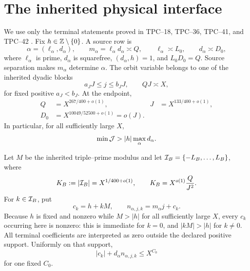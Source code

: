 \section{The inherited physical interface}
\label{sec:tpc43-interface}

We use only the terminal statements proved in TPC--18, TPC--36,
TPC--41, and TPC--42
\citep{WangTPC18,WangTPC36,WangTPC41,WangTPC42}.  Fix
\(h\in\mathbb Z\setminus\{0\}\).  A source row is
\begin{equation}
 \alpha=(\ell_\alpha,d_\alpha),
 \qquad
 m_\alpha=\ell_\alpha d_\alpha\asymp Q,
 \qquad
 \ell_\alpha\asymp L_0,
 \qquad
 d_\alpha\asymp D_0,
 \label{eq:tpc43-row}
\end{equation}
where \(\ell_\alpha\) is prime, \(d_\alpha\) is squarefree,
\((d_\alpha,h)=1\), and \(L_0D_0=Q\).  Source separation makes
\(m_\alpha\) determine \(\alpha\).  The orbit variable belongs to one
of the inherited dyadic blocks
\begin{equation}
 a_JJ\le j\le b_JJ,
 \qquad QJ\asymp X,
 \label{eq:tpc43-orbit-block}
\end{equation}
for fixed positive \(a_J<b_J\).  At the endpoint,
\begin{align}
 Q&=X^{267/400+o(1)},
 &J&=X^{133/400+o(1)},
 \label{eq:tpc43-QJ-endpoint}\\
 D_0&=X^{10049/52500+o(1)}=o(J).
 \label{eq:tpc43-D-endpoint}
\end{align}
In particular, for all sufficiently large \(X\),
\begin{equation}
 \min\mathcal J>|h|\max_\alpha d_\alpha.
 \label{eq:tpc43-rigidity-size}
\end{equation}

Let \(M\) be the inherited triple--prime modulus and let
\(\mathcal I_B=\{-L_B,\ldots,L_B\}\), where
\begin{equation}
 K_B:=|\mathcal I_B|=X^{1/400+o(1)},
 \qquad
 K_B=X^{o(1)}\frac{Q}{J^2}.
 \label{eq:tpc43-alias-ledger}
\end{equation}
For \(k\in\mathcal I_B\), put
\begin{equation}
 c_k=h+kM,
 \qquad
 n_{\alpha,j,k}=m_\alpha j+c_k.
 \label{eq:tpc43-terminal-n}
\end{equation}
Because \(h\) is fixed and nonzero while \(M>|h|\) for all sufficiently
large \(X\), every \(c_k\) occurring here is nonzero: this is immediate
for \(k=0\), and \(|kM|>|h|\) for \(k\ne0\).
All terminal coefficients are interpreted as zero outside the declared
positive support.  Uniformly on that support,
\begin{equation}
 |c_k|+d_\alpha n_{\alpha,j,k}\le X^{C_0}
 \label{eq:tpc43-polynomial-support}
\end{equation}
for one fixed \(C_0\).

